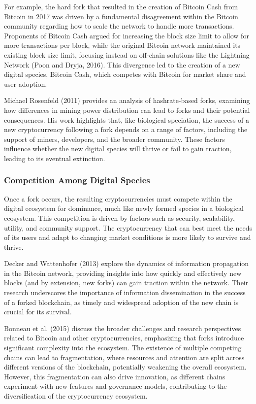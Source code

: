 \documentclass[12pt,twoside]{article}
\begin{document}
For example, the hard fork that resulted in the creation of Bitcoin Cash from Bitcoin in 2017 was driven by a fundamental disagreement within the Bitcoin community regarding how to scale the network to handle more transactions. Proponents of Bitcoin Cash argued for increasing the block size limit to allow for more transactions per block, while the original Bitcoin network maintained its existing block size limit, focusing instead on off-chain solutions like the Lightning Network (Poon and Dryja, 2016). This divergence led to the creation of a new digital species, Bitcoin Cash, which competes with Bitcoin for market share and user adoption.

Michael Rosenfeld (2011) provides an analysis of hashrate-based forks, examining how differences in mining power distribution can lead to forks and their potential consequences. His work highlights that, like biological speciation, the success of a new cryptocurrency following a fork depends on a range of factors, including the support of miners, developers, and the broader community. These factors influence whether the new digital species will thrive or fail to gain traction, leading to its eventual extinction.

\subsubsection{Competition Among Digital Species}

Once a fork occurs, the resulting cryptocurrencies must compete within the digital ecosystem for dominance, much like newly formed species in a biological ecosystem. This competition is driven by factors such as security, scalability, utility, and community support. The cryptocurrency that can best meet the needs of its users and adapt to changing market conditions is more likely to survive and thrive.

Decker and Wattenhofer (2013) explore the dynamics of information propagation in the Bitcoin network, providing insights into how quickly and effectively new blocks (and by extension, new forks) can gain traction within the network. Their research underscores the importance of information dissemination in the success of a forked blockchain, as timely and widespread adoption of the new chain is crucial for its survival.

Bonneau et al. (2015) discuss the broader challenges and research perspectives related to Bitcoin and other cryptocurrencies, emphasizing that forks introduce significant complexity into the ecosystem. The existence of multiple competing chains can lead to fragmentation, where resources and attention are split across different versions of the blockchain, potentially weakening the overall ecosystem. However, this fragmentation can also drive innovation, as different chains experiment with new features and governance models, contributing to the diversification of the cryptocurrency ecosystem.
\end{document}
